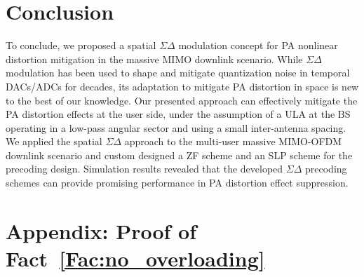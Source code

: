 \documentclass[10pt,twocolumn,twoside]{IEEEtran}
\begin{document}
\section{Conclusion}

To conclude, we proposed a spatial $\Sigma \Delta$ modulation concept for
PA nonlinear distortion mitigation in the massive MIMO downlink scenario.
While $\Sigma \Delta$ modulation has been used to shape and mitigate quantization noise in temporal DACs/ADCs for decades, its adaptation to mitigate PA distortion in space is new to the best of our knowledge.
Our presented approach can effectively mitigate the PA distortion effects at the user side, under the assumption of a ULA at the BS operating in a low-pass angular sector and using a small inter-antenna spacing.
We
applied the spatial $\Sigma \Delta$ approach to the multi-user massive MIMO-OFDM downlink scenario
and custom designed a ZF scheme and an SLP scheme for the precoding design.
Simulation results revealed that the developed $\Sigma \Delta$ precoding schemes can provide promising performance in PA distortion effect suppression.



\section*{Appendix: Proof of Fact~\ref{Fac:no_overloading}}



\end{document}
